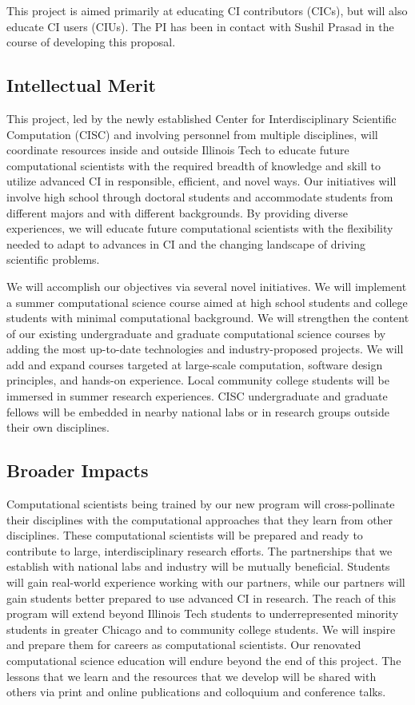 \documentclass[11pt]{NSFamsart}
\begin{document}
This project is aimed primarily at educating CI contributors (CICs), but will also educate CI users (CIUs).  The PI has been in contact with Sushil Prasad in the course of developing this proposal.

\subsection*{Intellectual Merit}
This project, led by the newly established Center for Interdisciplinary Scientific Computation (CISC) and involving personnel from multiple disciplines, will coordinate resources inside and outside Illinois Tech to educate future computational scientists with the required breadth of knowledge and skill to utilize advanced CI in responsible, efficient, and novel ways. Our initiatives will involve high school through doctoral students and accommodate students from different majors and with different backgrounds.  By providing diverse experiences, we will educate future computational scientists with the flexibility needed to adapt to advances in CI and the changing landscape of driving scientific problems. 

We will accomplish our objectives via several novel initiatives.  We will implement a summer computational science course aimed at high school students and college students with minimal computational background.  We will strengthen the content of our existing undergraduate and graduate computational science courses by adding the most up-to-date technologies and industry-proposed projects.  We will add and expand courses targeted at large-scale computation, software design principles, and hands-on experience.  Local community college students will be immersed in summer research experiences.  CISC undergraduate and graduate fellows will be embedded in nearby national labs or in research groups outside their own disciplines.  

\subsection*{Broader Impacts}
Computational scientists being trained by our new program will cross-pollinate their disciplines with the computational approaches that they learn from other disciplines.  These computational scientists will be prepared and ready to contribute to large, interdisciplinary research efforts.  The partnerships that we establish with national labs and industry will be mutually beneficial.  Students will gain real-world experience working with our partners, while our partners will gain students better prepared to use advanced CI in research. The reach of this program will extend beyond Illinois Tech students to underrepresented minority students in greater Chicago and to community college students.  We will inspire and prepare them for careers as computational scientists. Our renovated computational science education will endure beyond the end of this project.  The lessons that we learn and the resources that we develop will be shared with others via print and online publications and colloquium and conference talks.
\end{document}
